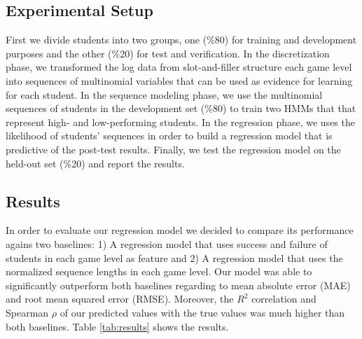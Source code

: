 \documentclass{sigchi}
\begin{document}
\subsection{Experimental Setup}
First we divide students into two groups, one (\%80) for training and development purposes and the other (\%20) for test and verification.
In the discretization phase, we transformed the log data from slot-and-filler structure each game level into sequences of multinomial variables that can be used as evidence for learning for each student.
In the sequence modeling phase, we use the multinomial sequences of students in the development set (\%80) to train two HMMs that that represent high- and low-performing students.
In the regression phase, we uses the likelihood of students' sequences in order to build a regression model that is predictive of the post-test results.
Finally, we test the regression model on the held-out set (\%20) and report the results.


\subsection{Results}
In order to evaluate our regression model we decided to compare its performance agains two baselines: 1) A regression model that uses success and failure of students in each game level as feature and 2) A regression model that uses the normalized sequence lengths in each game level. 
Our model was able to significantly outperform both baselines regarding to mean absolute error (MAE) and root mean squared error (RMSE). 
Moreover, the $R^2$ correlation and Spearman $\rho$ of our predicted values with the true values was much higher than both baselines. 
Table \ref{tab:results} shows the results. 
\end{document}
